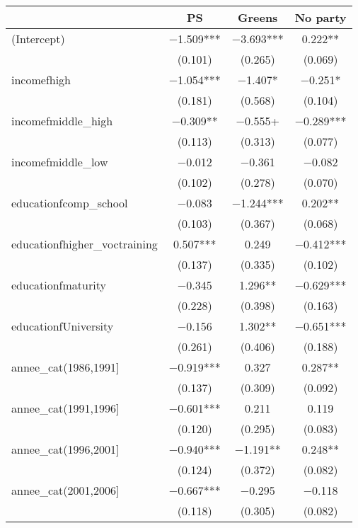 \begin{table}
\centering
\begin{tabular}[t]{lccc}
\toprule
  & PS & Greens & No party\\
\midrule
(Intercept) & \num{-1.509}*** & \num{-3.693}*** & \num{0.222}**\\
 & (\num{0.101}) & (\num{0.265}) & (\num{0.069})\\
incomefhigh & \num{-1.054}*** & \num{-1.407}* & \num{-0.251}*\\
 & (\num{0.181}) & (\num{0.568}) & (\num{0.104})\\
incomefmiddle\_high & \num{-0.309}** & \num{-0.555}+ & \num{-0.289}***\\
 & (\num{0.113}) & (\num{0.313}) & (\num{0.077})\\
incomefmiddle\_low & \num{-0.012} & \num{-0.361} & \num{-0.082}\\
 & (\num{0.102}) & (\num{0.278}) & (\num{0.070})\\
educationfcomp\_school & \num{-0.083} & \num{-1.244}*** & \num{0.202}**\\
 & (\num{0.103}) & (\num{0.367}) & (\num{0.068})\\
educationfhigher\_voctraining & \num{0.507}*** & \num{0.249} & \num{-0.412}***\\
 & (\num{0.137}) & (\num{0.335}) & (\num{0.102})\\
educationfmaturity & \num{-0.345} & \num{1.296}** & \num{-0.629}***\\
 & (\num{0.228}) & (\num{0.398}) & (\num{0.163})\\
educationfUniversity & \num{-0.156} & \num{1.302}** & \num{-0.651}***\\
 & (\num{0.261}) & (\num{0.406}) & (\num{0.188})\\
annee\_cat(1986,1991] & \num{-0.919}*** & \num{0.327} & \num{0.287}**\\
 & (\num{0.137}) & (\num{0.309}) & (\num{0.092})\\
annee\_cat(1991,1996] & \num{-0.601}*** & \num{0.211} & \num{0.119}\\
 & (\num{0.120}) & (\num{0.295}) & (\num{0.083})\\
annee\_cat(1996,2001] & \num{-0.940}*** & \num{-1.191}** & \num{0.248}**\\
 & (\num{0.124}) & (\num{0.372}) & (\num{0.082})\\
annee\_cat(2001,2006] & \num{-0.667}*** & \num{-0.295} & \num{-0.118}\\
 & (\num{0.118}) & (\num{0.305}) & (\num{0.082})\\

\end{tabular}
\end{table}
